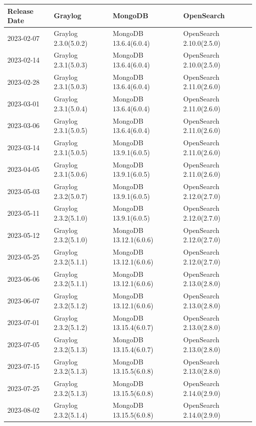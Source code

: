 \documentclass[../main.tex]{subfiles}
\begin{document}
\begin{table}[h]
\centering
\begin{tabular}{|l|l|l|l|}
\hline
\textbf{Release Date} & \textbf{Graylog}& \textbf{MongoDB}& \textbf{OpenSearch} \\ \hline
2023-02-07 & Graylog 2.3.0(5.0.2) & MongoDB 13.6.4(6.0.4) & OpenSearch 2.10.0(2.5.0) \\ \hline
2023-02-14 & Graylog 2.3.1(5.0.3) & MongoDB 13.6.4(6.0.4) & OpenSearch 2.10.0(2.5.0) \\ \hline
2023-02-28 & Graylog 2.3.1(5.0.3) & MongoDB 13.6.4(6.0.4) & OpenSearch 2.11.0(2.6.0) \\ \hline
2023-03-01 & Graylog 2.3.1(5.0.4) & MongoDB 13.6.4(6.0.4) & OpenSearch 2.11.0(2.6.0) \\ \hline
2023-03-06 & Graylog 2.3.1(5.0.5) & MongoDB 13.6.4(6.0.4) & OpenSearch 2.11.0(2.6.0) \\ \hline
2023-03-14 & Graylog 2.3.1(5.0.5) & MongoDB 13.9.1(6.0.5) & OpenSearch 2.11.0(2.6.0) \\ \hline
2023-04-05 & Graylog 2.3.1(5.0.6) & MongoDB 13.9.1(6.0.5) & OpenSearch 2.11.0(2.6.0) \\ \hline
2023-05-03 & Graylog 2.3.2(5.0.7) & MongoDB 13.9.1(6.0.5) & OpenSearch 2.12.0(2.7.0) \\ \hline
2023-05-11 & Graylog 2.3.2(5.1.0) & MongoDB 13.9.1(6.0.5) & OpenSearch 2.12.0(2.7.0) \\ \hline
2023-05-12 & Graylog 2.3.2(5.1.0) & MongoDB 13.12.1(6.0.6) & OpenSearch 2.12.0(2.7.0) \\ \hline
2023-05-25 & Graylog 2.3.2(5.1.1) & MongoDB 13.12.1(6.0.6) & OpenSearch 2.12.0(2.7.0) \\ \hline
2023-06-06 & Graylog 2.3.2(5.1.1) & MongoDB 13.12.1(6.0.6) & OpenSearch 2.13.0(2.8.0) \\ \hline
2023-06-07 & Graylog 2.3.2(5.1.2) & MongoDB 13.12.1(6.0.6) & OpenSearch 2.13.0(2.8.0) \\ \hline
2023-07-01 & Graylog 2.3.2(5.1.2) & MongoDB 13.15.4(6.0.7) & OpenSearch 2.13.0(2.8.0) \\ \hline
2023-07-05 & Graylog 2.3.2(5.1.3) & MongoDB 13.15.4(6.0.7) & OpenSearch 2.13.0(2.8.0) \\ \hline
2023-07-15 & Graylog 2.3.2(5.1.3) & MongoDB 13.15.5(6.0.8) & OpenSearch 2.13.0(2.8.0) \\ \hline
2023-07-25 & Graylog 2.3.2(5.1.3) & MongoDB 13.15.5(6.0.8) & OpenSearch 2.14.0(2.9.0) \\ \hline
2023-08-02 & Graylog 2.3.2(5.1.4) & MongoDB 13.15.5(6.0.8) & OpenSearch 2.14.0(2.9.0) \\ \hline

\end{tabular}
\end{table}
\end{document}
